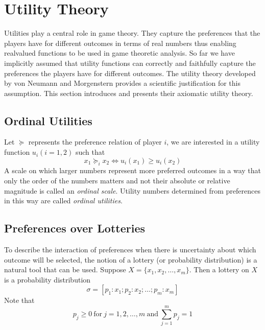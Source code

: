 \section{Utility Theory}
Utilities play a central role in game theory.
They capture the preferences that the players have for different outcomes in terms of real numbers thus enabling realvalued functions to be used in game theoretic analysis.
So far we have implicitly assumed that utility functions can correctly and faithfully capture the preferences the players have for different outcomes.
The utility theory developed by von Neumann and Morgenstern provides a scientific justification for this assumption.
This section introduces and presents their axiomatic utility theory.
\subsection{Ordinal Utilities}
Let $\succeq$ represents the preference relation of player $i$, we are interested in a utility function $u_i (i = 1, 2)$ such that
\[x_1\succeq_i x_2 \Leftrightarrow u_i(x_1)\geq u_i(x_2)\]
A scale on which larger numbers represent more preferred outcomes in a way that only the order of the numbers matters and not their absolute or relative magnitude is called an \emph{ordinal scale}.
Utility numbers determined from preferences in this way are called \emph{ordinal utilities}.
\subsection{Preferences over Lotteries}
To describe the interaction of preferences when there is uncertainty about which outcome will be selected, the notion of a lottery (or probability distribution) is a natural tool that can be used.
Suppose $X = \{x_1, x_2,\ldots, x_m\}$.
Then a lottery on $X$ is a probability distribution
\[\sigma=[p_1:x_1;p_2:x_2;\ldots;p_m:x_m]\]
Note that
\[p_j\geq 0 \ \text{for}\ j=1,2,\ldots,m \ \text{and}\ \sum_{j=1}^m p_j=1\]
